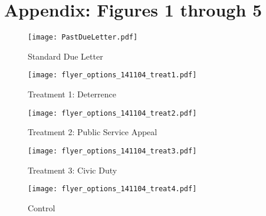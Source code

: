 \documentclass[12pt,titlepage]{article}
\begin{document}
\bigskip

\bigskip

\section*{Appendix: Figures 1 through 5}
 \newpage
 
\begin{figure}[htpb]
\begin{center}
\caption{Standard Due Letter}
\bigskip
\texttt{[image: PastDueLetter.pdf]}
\end{center}
\end{figure}
\newpage
\begin{figure}[htpb]
\begin{center}
\caption{Treatment 1: Deterrence}
\bigskip
\texttt{[image: flyer\_options\_141104\_treat1.pdf]}
\end{center}
\end{figure}
\newpage
\begin{figure}[htpb]
\begin{center}
\caption{Treatment 2: Public Service Appeal}
\bigskip
\texttt{[image: flyer\_options\_141104\_treat2.pdf]}
\end{center}
\end{figure}
\newpage
\begin{figure}[htpb]
\begin{center}
\caption{Treatment 3: Civic Duty}
\bigskip
\texttt{[image: flyer\_options\_141104\_treat3.pdf]}
\end{center}
\end{figure}
\newpage
\begin{figure}[htpb]
\begin{center}
\caption{Control}
\bigskip
\texttt{[image: flyer\_options\_141104\_treat4.pdf]}
\end{center}
\end{figure}
\end{document}
